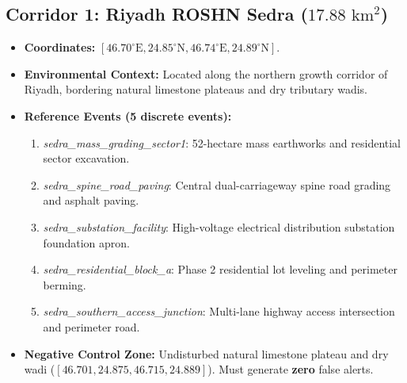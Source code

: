 \subsection{Corridor 1: Riyadh ROSHN Sedra ($17.88\text{ km}^2$)}
\begin{itemize}
    \item \textbf{Coordinates:} $[46.70^\circ\text{E}, 24.85^\circ\text{N}, 46.74^\circ\text{E}, 24.89^\circ\text{N}]$.
    \item \textbf{Environmental Context:} Located along the northern growth corridor of Riyadh, bordering natural limestone plateaus and dry tributary wadis.
    \item \textbf{Reference Events (5 discrete events):}
    \begin{enumerate}
        \item \textit{sedra\_mass\_grading\_sector1}: 52-hectare mass earthworks and residential sector excavation.
        \item \textit{sedra\_spine\_road\_paving}: Central dual-carriageway spine road grading and asphalt paving.
        \item \textit{sedra\_substation\_facility}: High-voltage electrical distribution substation foundation apron.
        \item \textit{sedra\_residential\_block\_a}: Phase 2 residential lot leveling and perimeter berming.
        \item \textit{sedra\_southern\_access\_junction}: Multi-lane highway access intersection and perimeter road.
    \end{enumerate}
    \item \textbf{Negative Control Zone:} Undisturbed natural limestone plateau and dry wadi ($[46.701, 24.875, 46.715, 24.889]$). Must generate \textbf{zero} false alerts.
\end{itemize}

